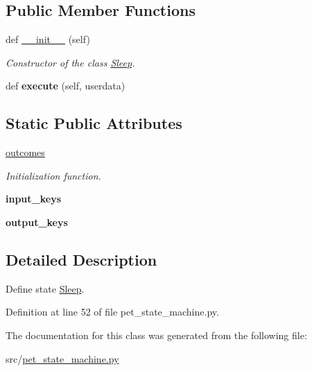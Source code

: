 \subsection*{Public Member Functions}
\begin{DoxyCompactItemize}
\item 
\mbox{\label{classpet__state__machine_1_1Sleep_aa45ef33d6c9e731a595d841a1cf37da8}} 
def \hyperlink{classpet__state__machine_1_1Sleep_aa45ef33d6c9e731a595d841a1cf37da8}{\+\_\+\+\_\+init\+\_\+\+\_\+} (self)
\begin{DoxyCompactList}\small\item\em Constructor of the class \hyperlink{classpet__state__machine_1_1Sleep}{Sleep}. \end{DoxyCompactList}\item 
\mbox{\label{classpet__state__machine_1_1Sleep_a712d227590b926b6f6ecae77a902c953}} 
def {\bfseries execute} (self, userdata)
\end{DoxyCompactItemize}
\subsection*{Static Public Attributes}
\begin{DoxyCompactItemize}
\item 
\mbox{\label{classpet__state__machine_1_1Sleep_a5b34066ea6ce7eaa010357631e8d3108}} 
\hyperlink{classpet__state__machine_1_1Sleep_a5b34066ea6ce7eaa010357631e8d3108}{outcomes}
\begin{DoxyCompactList}\small\item\em Initialization function. \end{DoxyCompactList}\item 
\mbox{\label{classpet__state__machine_1_1Sleep_a7d8c0da233246ae0e17976ca62a4333e}} 
{\bfseries input\+\_\+keys}
\item 
\mbox{\label{classpet__state__machine_1_1Sleep_a8370a7005ab195ae95f8d29bf8cb4d3f}} 
{\bfseries output\+\_\+keys}
\end{DoxyCompactItemize}


\subsection{Detailed Description}
Define state \hyperlink{classpet__state__machine_1_1Sleep}{Sleep}. 

Definition at line 52 of file pet\+\_\+state\+\_\+machine.\+py.



The documentation for this class was generated from the following file\+:\begin{DoxyCompactItemize}
\item 
src/\hyperlink{pet__state__machine_8py}{pet\+\_\+state\+\_\+machine.\+py}\end{DoxyCompactItemize}

